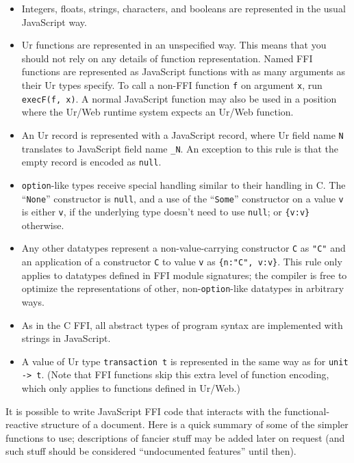 \documentclass{article}
\begin{document}
\begin{itemize}
\item Integers, floats, strings, characters, and booleans are represented in the usual JavaScript way.
\item Ur functions are represented in an unspecified way.  This means that you should not rely on any details of function representation.  Named FFI functions are represented as JavaScript functions with as many arguments as their Ur types specify.  To call a non-FFI function \texttt{f} on argument \texttt{x}, run \texttt{execF(f, x)}.  A normal JavaScript function may also be used in a position where the Ur/Web runtime system expects an Ur/Web function.
\item An Ur record is represented with a JavaScript record, where Ur field name \texttt{N} translates to JavaScript field name \texttt{\_N}.  An exception to this rule is that the empty record is encoded as \texttt{null}.
\item \texttt{option}-like types receive special handling similar to their handling in C.  The ``\texttt{None}'' constructor is \texttt{null}, and a use of the ``\texttt{Some}'' constructor on a value \texttt{v} is either \texttt{v}, if the underlying type doesn't need to use \texttt{null}; or \texttt{\{v:v\}} otherwise.
\item Any other datatypes represent a non-value-carrying constructor \texttt{C} as \texttt{"C"} and an application of a constructor \texttt{C} to value \texttt{v} as \texttt{\{n:"C", v:v\}}.  This rule only applies to datatypes defined in FFI module signatures; the compiler is free to optimize the representations of other, non-\texttt{option}-like datatypes in arbitrary ways.
\item As in the C FFI, all abstract types of program syntax are implemented with strings in JavaScript.
\item A value of Ur type \texttt{transaction t} is represented in the same way as for \texttt{unit -> t}.  (Note that FFI functions skip this extra level of function encoding, which only applies to functions defined in Ur/Web.)
\end{itemize}

It is possible to write JavaScript FFI code that interacts with the functional-reactive structure of a document.  Here is a quick summary of some of the simpler functions to use; descriptions of fancier stuff may be added later on request (and such stuff should be considered ``undocumented features'' until then).
\end{document}
